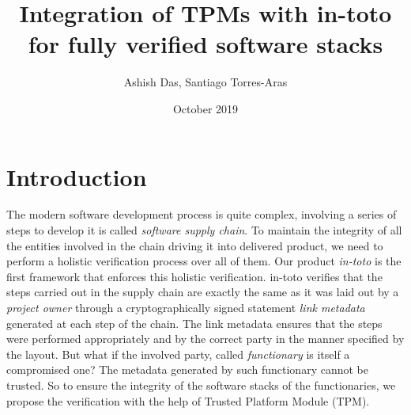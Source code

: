 \documentclass{article}
\title{Integration of TPMs with in-toto for fully verified software stacks}
\author{Ashish Das, Santiago Torres-Aras}
\date{October 2019}
\begin{document}
\maketitle

\section{Introduction}
The modern software development process is quite complex, involving a series of steps to develop it is called \textit{software supply chain}. To maintain the integrity of all the entities involved in the chain driving it into delivered product, we need to perform a holistic verification process over all of them. Our product \textit{in-toto} is the first framework that enforces this holistic verification. in-toto verifies that the steps carried out in the supply chain are exactly the same as it was laid out by a \textit{project owner} through a cryptographically signed statement \textit{link metadata} generated at each step of the chain. The link metadata ensures that the steps were performed appropriately and by the correct party in the manner specified by the layout. But what if the involved party, called \textit{functionary} is itself a compromised one? The metadata generated by such functionary cannot be trusted. So to ensure the integrity of the software stacks of the functionaries, we propose the verification with the help of Trusted Platform Module (TPM). 
\end{document}
